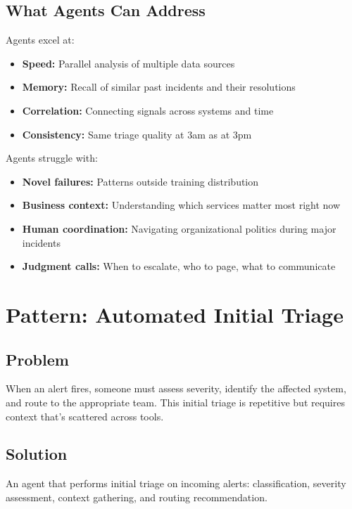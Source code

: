 \subsection{What Agents Can Address}
\label{subsec:agent-capabilities}

Agents excel at:
\begin{itemize}
    \item \textbf{Speed:} Parallel analysis of multiple data sources
    \item \textbf{Memory:} Recall of similar past incidents and their resolutions
    \item \textbf{Correlation:} Connecting signals across systems and time
    \item \textbf{Consistency:} Same triage quality at 3am as at 3pm
\end{itemize}

Agents struggle with:
\begin{itemize}
    \item \textbf{Novel failures:} Patterns outside training distribution
    \item \textbf{Business context:} Understanding which services matter most right now
    \item \textbf{Human coordination:} Navigating organizational politics during major incidents
    \item \textbf{Judgment calls:} When to escalate, who to page, what to communicate
\end{itemize}

\section{Pattern: Automated Initial Triage}
\label{sec:auto-triage}

\subsection{Problem}

When an alert fires, someone must assess severity, identify the affected system, and route to the appropriate team. This initial triage is repetitive but requires context that's scattered across tools.

\subsection{Solution}

An agent that performs initial triage on incoming alerts: classification, severity assessment, context gathering, and routing recommendation.

